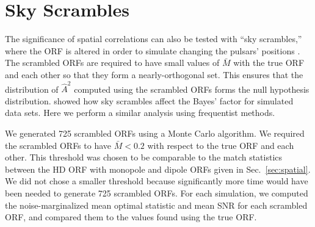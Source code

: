 \documentclass[twocolumn,aps,prd,superscriptaddress]{revtex4-1}
\begin{document}
\section{Sky Scrambles}
\label{sec:skyscrambles}

The significance of spatial correlations can also be tested with ``sky scrambles,'' 
where the ORF is altered in order to simulate changing the pulsars' positions \citep{cs2016,tlb+2017}. 
The scrambled ORFs are required to have small values of $\bar{M}$ 
with the true ORF and each other so that they form a nearly-orthogonal set. 
This ensures that the distribution of $\hat{A}^2$ computed using the scrambled ORFs 
forms the null hypothesis distribution. 
\citet{tlb+2017} showed how sky scrambles affect the Bayes' factor for simulated data sets. 
Here we perform a similar analysis using frequentist methods.

We generated 725 scrambled ORFs 
using a Monte Carlo algorithm. 
We required the scrambled ORFs to have $\bar{M} < 0.2$ 
with respect to the true ORF and each other. 
This threshold was chosen to be comparable to the match statistics 
between the HD ORF with monopole and dipole ORFs 
given in Sec.~\ref{sec:spatial}. 
We did not chose a smaller threshold because significantly more time 
would have been needed to generate 725 scrambled ORFs. 
For each simulation, we computed the 
noise-marginalized mean optimal statistic and mean SNR 
for each scrambled ORF, 
and compared them to the values found using the true ORF.
\end{document}
